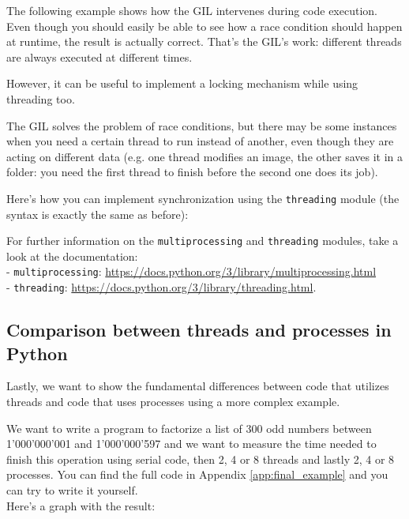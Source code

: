 


The following example shows how the GIL intervenes during code execution. Even though you should easily be able to see how a race condition should happen at runtime, the result is actually correct. That's the GIL's work: different threads are always executed at different times. 



However, it can be useful to implement a locking mechanism while using threading too. 

The GIL solves the problem of race conditions, but there may be some instances when you need a certain thread to run instead of another, even though they are acting on different data (e.g. one thread modifies an image, the other saves it in a folder: you need the first thread to finish before the second one does its job). 

Here's how you can implement synchronization using the \texttt{threading} module (the syntax is exactly the same as before):



For further information on the \texttt{multiprocessing} and \texttt{threading} modules, take a look at the documentation: \\ - \texttt{multiprocessing}: \url{https://docs.python.org/3/library/multiprocessing.html}
\\ - \texttt{threading}: \url{https://docs.python.org/3/library/threading.html}.

\subsection{Comparison between threads and processes in Python}\label{sec:thread_process}

Lastly, we want to show the fundamental differences between code that utilizes threads and code that uses processes using a more complex example.

We want to write a program to factorize a list of 300 odd numbers between 1'000'000'001 and 1'000'000'597 and we want to measure the time needed to finish this operation using serial code, then 2, 4 or 8 threads and lastly 2, 4 or 8 processes. You can find the full code in Appendix \ref{app:final_example} and you can try to write it yourself. \\
Here's a graph with the result:

